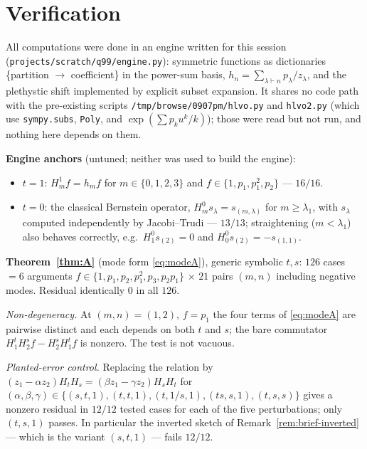 \documentclass[11pt]{article}
\theoremstyle{definition}
\newcommand{\Hop}{H}
\begin{document}
\section{Verification}

All computations were done in an engine written for this session
(\texttt{projects/scratch/q99/engine.py}): symmetric functions as dictionaries
\{partition $\to$ coefficient\} in the power-sum basis, $h_n=\sum_{\lambda\vdash n}p_\lambda/z_\lambda$,
and the plethystic shift implemented by explicit subset expansion. It shares no code path with
the pre-existing scripts \texttt{/tmp/browse/0907pm/hlvo.py} and \texttt{hlvo2.py} (which use
\texttt{sympy.subs}, \texttt{Poly}, and $\exp(\sum p_ku^k/k)$); those were read but not run,
and nothing here depends on them.

\medskip\noindent\textbf{Engine anchors} (untuned; neither was used to build the engine):
\begin{itemize}
\item $t=1$: $\Hop^{1}_mf=h_mf$ for $m\in\{0,1,2,3\}$ and $f\in\{1,p_1,p_1^2,p_2\}$ --- $16/16$.
\item $t=0$: the classical Bernstein operator, $\Hop^{0}_m s_\lambda=s_{(m,\lambda)}$ for
$m\ge\lambda_1$, with $s_\lambda$ computed independently by Jacobi--Trudi --- $13/13$;
straightening ($m<\lambda_1$) also behaves correctly, e.g.\ $\Hop^0_1s_{(2)}=0$ and
$\Hop^0_0s_{(2)}=-s_{(1,1)}$.
\end{itemize}

\medskip\noindent\textbf{Theorem~\ref{thm:A}} (mode form \eqref{eq:modeA}), generic symbolic
$t,s$: $126$ cases $=6$ arguments $f\in\{1,p_1,p_2,p_1^2,p_3,p_2p_1\}$ $\times$ $21$ pairs
$(m,n)$ including negative modes. Residual identically $0$ in all $126$.

\smallskip\noindent\emph{Non-degeneracy.} At $(m,n)=(1,2)$, $f=p_1$ the four terms of
\eqref{eq:modeA} are pairwise distinct and each depends on both $t$ and $s$; the bare
commutator $\Hop^t_1\Hop^s_2f-\Hop^s_2\Hop^t_1f$ is nonzero. The test is not vacuous.

\smallskip\noindent\emph{Planted-error control.} Replacing the relation by
$(z_1-\alpha z_2)\Hop_t\Hop_s=(\beta z_1-\gamma z_2)\Hop_s\Hop_t$ for
$(\alpha,\beta,\gamma)\in\{(s,t,1),(t,t,1),(t,1/s,1),(ts,s,1),(t,s,s)\}$ gives a nonzero
residual in $12/12$ tested cases for each of the five perturbations; only $(t,s,1)$ passes.
In particular the inverted sketch of Remark~\ref{rem:brief-inverted} --- which is the variant
$(s,t,1)$ --- fails $12/12$.
\end{document}
